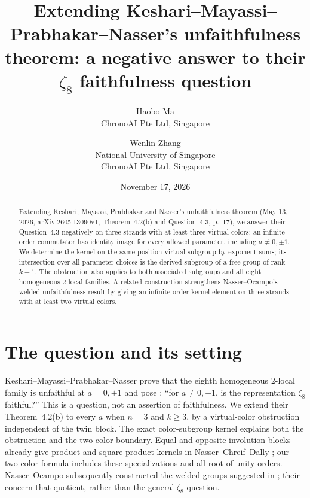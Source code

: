 \documentclass[11pt]{article}
\title{Extending Keshari--Mayassi--Prabhakar--Nasser's unfaithfulness theorem:
a negative answer to their \texorpdfstring{$\zeta_8$}{zeta8} faithfulness question}
\author{Haobo Ma\\\small ChronoAI Pte Ltd, Singapore
\and Wenlin Zhang\\\small National University of Singapore\\\small ChronoAI Pte Ltd, Singapore}
\date{November 17, 2026}
\begin{document}
\maketitle
\begin{abstract}
Extending Keshari, Mayassi, Prabhakar and Nasser's unfaithfulness theorem
(May 13, 2026, arXiv:2605.13090v1, Theorem~4.2(b) and Question~4.3, p.~17),
we answer their Question~4.3 negatively on three strands with at least
three virtual colors: an infinite-order commutator has identity image for
every allowed parameter, including $a\ne0,\pm1$.
We determine the kernel on the same-position virtual subgroup by exponent
sums; its intersection over all parameter choices is the derived subgroup
of a free group of rank $k-1$.
The obstruction also applies to both associated subgroups and all eight
homogeneous $2$-local families. A related construction strengthens
Nasser--Ocampo's welded unfaithfulness result by giving an infinite-order
kernel element on three strands with at least two virtual colors.
\end{abstract}

\section{The question and its setting}
Keshari--Mayassi--Prabhakar--Nasser prove that the eighth homogeneous
$2$-local family is unfaithful at $a=0,\pm1$ and pose
\cite[Question~4.3, p.~17]{KMPN}: ``for $a\ne0,\pm1$, is the
representation $\zeta_8$ faithful?'' This is a question, not an assertion
of faithfulness. We extend their Theorem~4.2(b) to every $a$ when $n=3$
and $k\ge3$, by a virtual-color obstruction independent of the twin block.
The exact color-subgroup kernel explains both the obstruction and the
two-color boundary. Equal and opposite involution blocks already give
product and square-product kernels in Nasser--Chreif--Dally
\cite[Theorem~11(2), proof Case~2, p.~7]{NCD}; our two-color formula
includes these specializations and all root-of-unity orders.
Nasser--Ocampo subsequently constructed the welded
groups suggested in \cite[Section~6, p.~26]{KMPN}; their
\cite[Definition~2.1 and Proposition~3.4]{NO} concern that quotient,
rather than the general $\zeta_8$ question.
\end{document}
